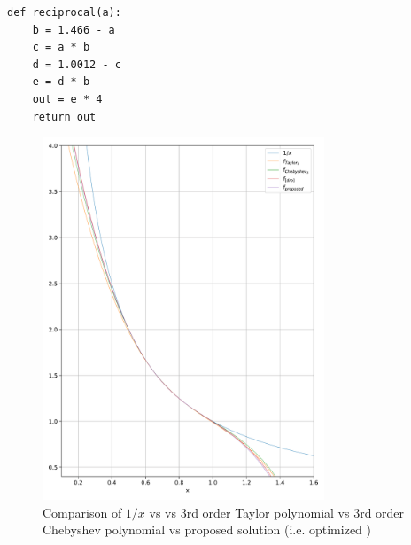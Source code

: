 \begin{verbatim}
def reciprocal(a):
    b = 1.466 - a
    c = a * b
    d = 1.0012 - c
    e = d * b
    out = e * 4
    return out
\end{verbatim}


\begin{figure}
    \centering
    \includegraphics[width=0.75\textwidth]{figures/reciprocate_real_vs_taylor_vs_drom.pdf}
    \caption{Comparison of $1/x$ vs \cite{drom} vs 3rd order Taylor polynomial vs 3rd order Chebyshev polynomial vs proposed solution (i.e. optimized \cite{drom})}
    \label{fig:0203012875432985734}
\end{figure}

